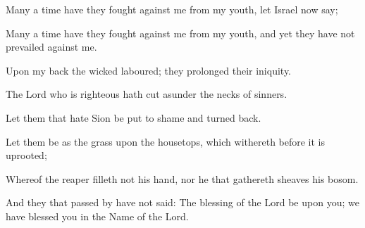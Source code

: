 Many a time have they fought against me from my youth, let Israel now say;

Many a time have they fought against me from my youth, and yet they have not prevailed against me.

Upon my back the wicked laboured; they prolonged their iniquity.

The Lord who is righteous hath cut asunder the necks of sinners.

Let them that hate Sion be put to shame and turned back.

Let them be as the grass upon the housetops, which withereth before it is uprooted;

Whereof the reaper filleth not his hand, nor he that gathereth sheaves his bosom.

And they that passed by have not said: The blessing of the Lord be upon you; we have blessed you in the Name of the Lord.
